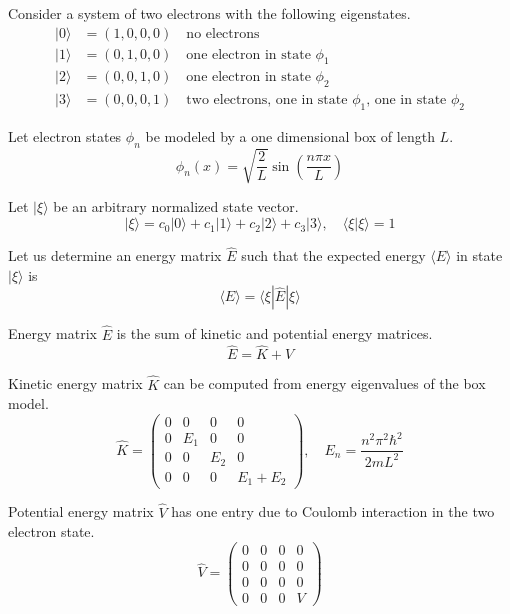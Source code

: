 \documentclass[12pt]{article}
\begin{document}
Consider a system of two electrons with the following eigenstates.
\begin{align*}
|0\rangle&=(1,0,0,0)\quad\text{no electrons}\\
|1\rangle&=(0,1,0,0)\quad\text{one electron in state $\phi_1$}\\
|2\rangle&=(0,0,1,0)\quad\text{one electron in state $\phi_2$}\\
|3\rangle&=(0,0,0,1)\quad\text{two electrons, one in state $\phi_1$, one in state $\phi_2$}
\end{align*}

Let electron states $\phi_n$ be modeled by a one dimensional box of length $L$.
\begin{equation*}
\phi_n(x)=\sqrt{\frac{2}{L}}\sin\left(\frac{n\pi x}{L}\right)
\end{equation*}

Let $|\xi\rangle$ be an arbitrary normalized state vector.
\begin{equation*}
|\xi\rangle=c_0|0\rangle+c_1|1\rangle+c_2|2\rangle+c_3|3\rangle,\quad\langle\xi|\xi\rangle=1
\end{equation*}

Let us determine an energy matrix $\hat{E}$ such that the expected
energy $\langle E \rangle$ in state $|\xi\rangle$ is
\begin{equation*}
\langle E\rangle=\langle\xi|\hat{E}|\xi\rangle
\end{equation*}

Energy matrix $\hat{E}$ is the sum of kinetic and potential energy matrices.
\begin{equation*}
\hat{E}=\hat{K}+\hat{V}
\end{equation*}

Kinetic energy matrix $\hat{K}$ can be computed from energy eigenvalues of the box model.
\begin{equation*}
\hat{K}=\begin{pmatrix}
0 & 0 & 0 & 0\\
0 & E_1 & 0 & 0\\
0 & 0 & E_2 & 0\\
0 & 0 & 0 & E_1+E_2
\end{pmatrix},
\quad
E_n=\frac{n^2\pi^2\hbar^2}{2mL^2}
\end{equation*}

Potential energy matrix $\hat{V}$ has one entry due to Coulomb interaction in the two electron state.
\begin{equation*}
\hat{V}=
\begin{pmatrix}
0 & 0 & 0 & 0\\
0 & 0 & 0 & 0\\
0 & 0 & 0 & 0\\
0 & 0 & 0 & V
\end{pmatrix}
\end{equation*}
\end{document}
